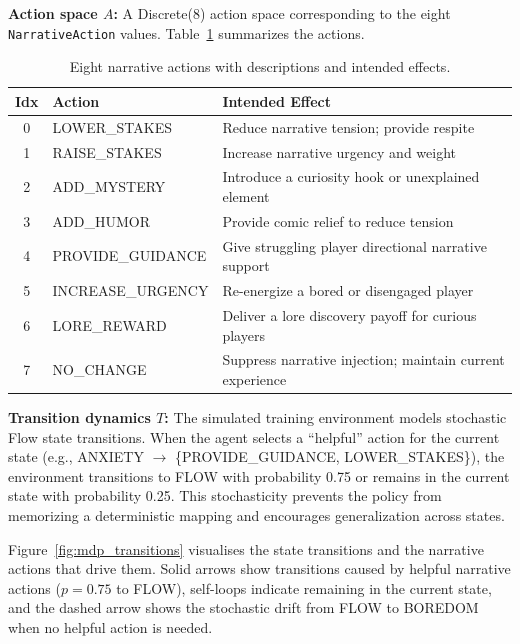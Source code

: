 \textbf{Action space $A$:} A Discrete(8) action space corresponding to the eight \texttt{NarrativeAction} values. Table~\ref{tab:actions} summarizes the actions.

\begin{table}[H]
\centering
\caption{Eight narrative actions with descriptions and intended effects.}
\label{tab:actions}
\small
\begin{tabular}{@{}cll@{}}
\toprule
\textbf{Idx} & \textbf{Action} & \textbf{Intended Effect} \\
\midrule
0 & LOWER\_STAKES & Reduce narrative tension; provide respite \\
1 & RAISE\_STAKES & Increase narrative urgency and weight \\
2 & ADD\_MYSTERY & Introduce a curiosity hook or unexplained element \\
3 & ADD\_HUMOR & Provide comic relief to reduce tension \\
4 & PROVIDE\_GUIDANCE & Give struggling player directional narrative support \\
5 & INCREASE\_URGENCY & Re-energize a bored or disengaged player \\
6 & LORE\_REWARD & Deliver a lore discovery payoff for curious players \\
7 & NO\_CHANGE & Suppress narrative injection; maintain current experience \\
\bottomrule
\end{tabular}
\end{table}

\textbf{Transition dynamics $T$:} The simulated training environment models stochastic Flow state transitions. When the agent selects a ``helpful'' action for the current state (e.g., ANXIETY $\rightarrow$ \{PROVIDE\_GUIDANCE, LOWER\_STAKES\}), the environment transitions to FLOW with probability 0.75 or remains in the current state with probability 0.25. This stochasticity prevents the policy from memorizing a deterministic mapping and encourages generalization across states.

Figure~\ref{fig:mdp_transitions} visualises the state transitions and the narrative actions that drive them. Solid arrows show transitions caused by helpful narrative actions ($p = 0.75$ to FLOW), self-loops indicate remaining in the current state, and the dashed arrow shows the stochastic drift from FLOW to BOREDOM when no helpful action is needed.

